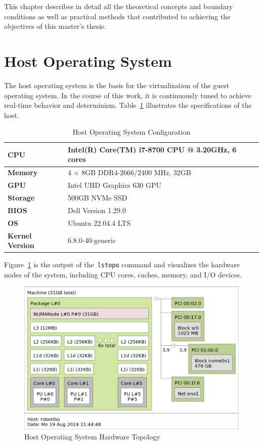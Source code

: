 \documentclass[MMR,Master,english]{twbook}
\begin{document}
This chapter describes in detail all the theoretical concepts and boundary conditions as well as practical methods that contributed to achieving the objectives of this master's thesis.

\section{Host Operating System}\label{sec:host_operating_system}
The host operating system is the basis for the virtualization of the guest operating system. In the course of this work, it is continuously tuned to achieve real-time behavior and determinism. Table~\ref{tab:testbed_configuration} illustrates the specifications of the host.

\begin{table}[H]
	\centering
	\caption[Host Operating System Configuration]{Host Operating System Configuration}
	\label{tab:testbed_configuration}
	\setlength{\tabcolsep}{0.5em} %
	{\renewcommand{\arraystretch}{1.2}%
		\begin{tabular}{|l|l|}
			\hline
			\textbf{CPU}            & Intel(R) Core(TM) i7-8700 CPU @ 3.20GHz, 6 cores \\ \hline
			\textbf{Memory}         & 4 $\times$ 8GB DDR4-2666/2400 MHz, 32GB          \\ \hline
			\textbf{GPU}            & Intel UHD Graphics 630 GPU                       \\ \hline
			\textbf{Storage}        & 500GB NVMe SSD                                   \\ \hline
			\textbf{BIOS}           & Dell Version 1.29.0                              \\ \hline
			\textbf{OS}             & Ubuntu 22.04.4 LTS                               \\ \hline
			\textbf{Kernel Version} & 6.8.0-40-generic                                 \\ \hline
		\end{tabular}}
\end{table}

\noindent Figure~\ref{fig:lstopo} is the output of the~\texttt{lstopo} command and visualizes the hardware nodes of the system, including CPU cores, caches, memory, and I/O devices.
\begin{figure}[H]
	\centering
	\includegraphics[width=0.55\columnwidth]{img/lstopo.png}
	\caption[Host Operating System Hardware Topology]{Host Operating System Hardware Topology}
	\label{fig:lstopo}
\end{figure}
\end{document}

